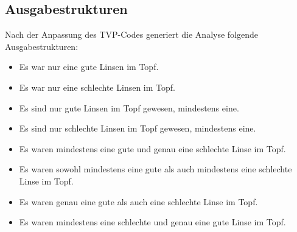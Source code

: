 \subsection{Ausgabestrukturen}
Nach der Anpassung des TVP-Codes generiert die Analyse folgende Ausgabestrukturen:
\begin{itemize}[$\rightarrow$]
	\item Es war nur eine gute Linsen im Topf.
	\item Es war nur eine schlechte Linsen im Topf.
	\item Es sind nur gute Linsen im Topf gewesen, mindestens eine.
	\item Es sind nur schlechte Linsen im Topf gewesen, mindestens eine.
	\item Es waren mindestens eine gute und genau eine schlechte Linse im Topf.
	\item Es waren sowohl mindestens eine gute als auch mindestens eine schlechte Linse im Topf.
	\item Es waren genau eine gute als auch eine schlechte Linse im Topf.
	\item Es waren mindestens eine schlechte und genau eine gute Linse im Topf.
\end{itemize}